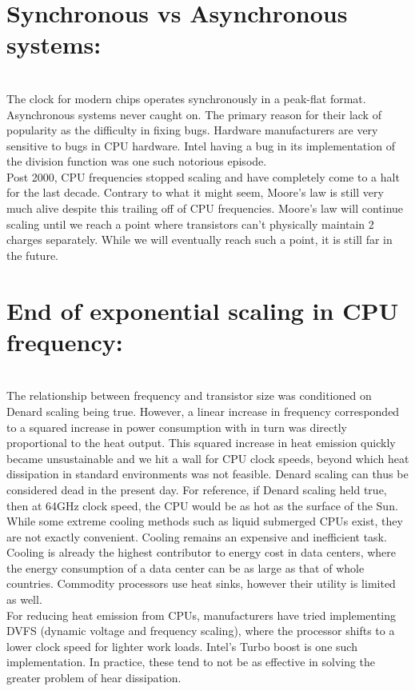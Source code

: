 \documentclass[twoside]{article}
\begin{document}
\section{Synchronous vs Asynchronous systems:}\\
The clock for modern chips operates synchronously in a peak-flat format. Asynchronous systems never caught on. The primary reason for their lack of popularity as the difficulty in fixing bugs. Hardware manufacturers are very sensitive to bugs in CPU hardware. Intel having a bug in its implementation of the division function was one such notorious episode.\\
Post 2000, CPU frequencies stopped scaling and have completely come to a halt for the last decade. Contrary to what it might seem, Moore's law is still very much alive despite this trailing off of CPU frequencies. Moore's law will continue scaling until we reach a point where transistors can't physically maintain 2 charges separately. While we will eventually reach such a point, it is still far in the future. \\
\section{End of exponential scaling in CPU frequency:}\\
The relationship between frequency and transistor size was conditioned on Denard scaling being true. However, a linear increase in frequency corresponded to a squared increase in power consumption with in turn was directly proportional to the heat output. This squared increase in heat emission quickly became unsustainable and we hit a wall for CPU clock speeds, beyond which heat dissipation in standard environments was not feasible. Denard scaling can thus be considered dead in the present day. For reference, if Denard scaling held true, then at 64GHz clock speed, the CPU would be as hot as the surface of the Sun.\\
While some extreme cooling methods such as liquid submerged CPUs exist, they are not exactly convenient. Cooling remains an expensive and inefficient task. Cooling is already the highest contributor to energy cost in data centers, where the energy consumption of a data center can be as large as that of whole countries. Commodity processors use heat sinks, however their utility is limited as well.\\
For reducing heat emission from CPUs, manufacturers have tried implementing DVFS (dynamic voltage and frequency scaling), where the processor shifts to a lower clock speed for lighter work loads. Intel's Turbo boost is one such implementation. In practice, these tend to not be as effective in solving the greater problem of hear dissipation.\\
\\
\end{document}
